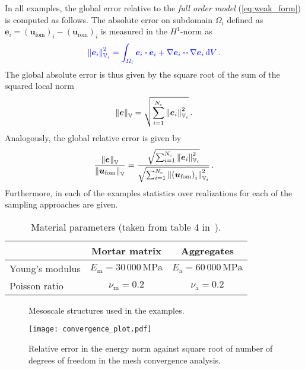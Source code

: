 \documentclass[AMA,STIX1COL,doublespace]{WileyNJD-v2}
\newcommand{\NumReal}{20}
\begin{document}
In all examples, the global error relative to the \textit{full order model} (\cref{eq:weak_form}) is computed as follows.
The absolute error on subdomain $\varOmega_i$ defined as $\bm{e}_i = {(\bm{u}_{\mathrm{fom}})}_i - {(\bm{u}_{\mathrm{rom}})}_i$ is measured in the $H^1$-norm as
\begin{equation}
	\label{eq:norm_squared}
    \color{blue} \norm{\bm{e}_i}^2_{\mathbb{V}_i} = \int_{\varOmega_i} \bm{e}_i \vdot \bm{e}_i + \nabla\bm{e}_i \vdot\!\vdot\,\nabla\bm{e}_i \,\dd V\,.
\end{equation}
The global absolute error is thus given by the square root of the sum of the squared local norm
\begin{equation}
	\label{eq:gl_abs_err}
	\norm{\bm{e}}_{\mathbb{V}} = \sqrt{\sum_{i=1}^{N_{\mathrm{c}}} \norm{\bm{e}_i}^2_{\mathbb{V}_i}}\,.
\end{equation}
Analogously, the global relative error is given by
\begin{equation}
	\label{eq:gl_rel_err}
	\frac{\norm{\bm{e}}_{\mathbb{V}}}{\norm{\bm{u}_{\mathrm{fom}}}_{\mathbb{V}}}
	= \frac{\sqrt{\sum_{i=1}^{N_{\mathrm{c}}} \norm{\bm{e}_i}^2_{\mathbb{V}_i}}
	}{\sqrt{\sum_{i=1}^{N_{\mathrm{c}}} \norm{{(\bm{u}_{\mathrm{fom}})}_i}^2_{\mathbb{V}_i}}
}\,.
\end{equation}
Furthermore, in each of the examples statistics over \replaced[id=pd]{$\NumReal{}$}{$10$}
realizations for each of the sampling approaches are given.
\begin{table}[tb]
    \centering
    \caption{Material parameters (taken from table 4 in~\cite{Unger2011a}).}%
    \label{tab:concrete_parameters}
    \begin{tabular}{lcc}\toprule
    & Mortar matrix & Aggregates\\ \midrule
	    Young's modulus & $E_{\mathrm{m}} = 30\,000\,\mathrm{MPa}$ & $E_{\mathrm{a}}=60\,000\,\mathrm{MPa}$ \\
	    Poisson ratio & $\nu_{\mathrm{m}} = 0.2$ & $\nu_{\mathrm{a}}=0.2$ \\
       \bottomrule
    \end{tabular}
\end{table}

\begin{figure}[htb]
	\centering
	\caption{Mesoscale structures used in the examples.}%
	\label{fig:rce_types}
\end{figure}
\begin{figure}[htb]
	\centering
	\texttt{[image: convergence\_plot.pdf]}
	\caption{Relative error in the energy norm against square root of number of degrees of freedom in the mesh convergence analysis.}%
	\label{fig:convergence}
\end{figure}
\end{document}
